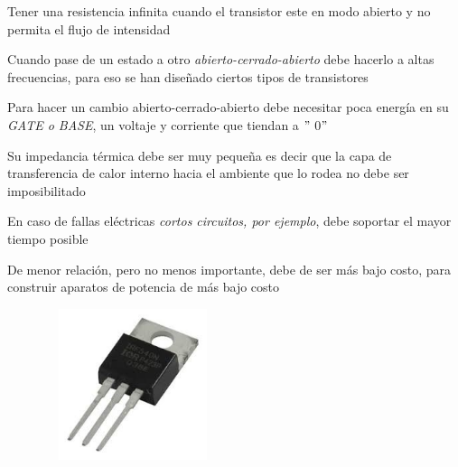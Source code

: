 \documentclass[12pt]{article}
\begin{document}
\setlength{\parskip}{8.04pt}
\begin{adjustwidth}{0.25in}{0.0in}
Tener una resistencia infinita cuando el transistor este en modo abierto y no permita el flujo de intensidad\par

\end{adjustwidth}

\begin{adjustwidth}{0.38in}{0.0in}
 Cuando pase de un estado a otro \textit{abierto-cerrado-abierto }debe hacerlo a altas frecuencias, para eso se han diseñado ciertos tipos de transistores\par

\end{adjustwidth}

\begin{adjustwidth}{0.38in}{0.0in}
 Para hacer un cambio abierto-cerrado-abierto debe necesitar poca energía en su \textit{GATE o BASE}, un voltaje y corriente que tiendan a $"$ 0$"$ \par

\end{adjustwidth}

\begin{adjustwidth}{0.38in}{0.0in}
 Su impedancia térmica debe ser muy pequeña es decir que la capa de transferencia de calor interno hacia el ambiente que lo rodea no debe ser imposibilitado\par

\end{adjustwidth}

\begin{adjustwidth}{0.25in}{0.0in}
En caso de fallas eléctricas \textit{cortos circuitos, por ejemplo}, debe soportar el mayor tiempo posible\par

\end{adjustwidth}

\begin{adjustwidth}{0.25in}{0.0in}
De menor relación, pero no menos importante, debe de ser más bajo costo, para construir aparatos de potencia de más bajo costo\par

\end{adjustwidth}




\begin{figure}[H]
	\begin{Center}
		\includegraphics[width=2.06in,height=1.74in]{./media/image2.jpg}
	\end{Center}
\end{figure}
\end{document}
